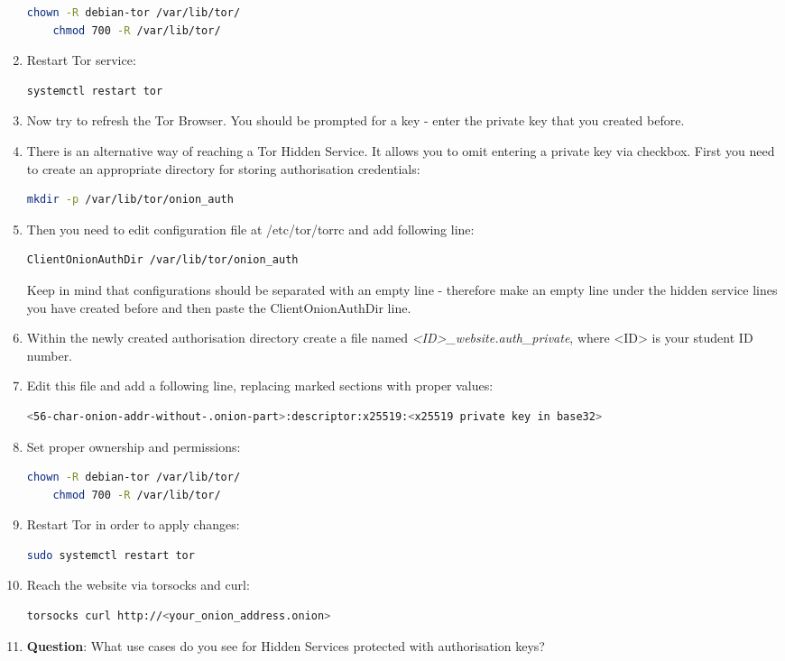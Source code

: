 \begin{enumerate}
\begin{lstlisting}[language=bash]
    chown -R debian-tor /var/lib/tor/
    chmod 700 -R /var/lib/tor/
    \end{lstlisting}
    \item Restart Tor service:
    \begin{lstlisting}[language=bash]
    systemctl restart tor
    \end{lstlisting}
    \item Now try to refresh the Tor Browser. You should be prompted for a key - enter the private key that you created before.
    \item There is an alternative way of reaching a Tor Hidden Service. It allows you to omit entering a private key via checkbox. First you need to create an appropriate directory for storing authorisation credentials:
    \begin{lstlisting}[language=bash]
    mkdir -p /var/lib/tor/onion_auth
    \end{lstlisting}
    \item Then you need to edit configuration file at /etc/tor/torrc and add following line:
    \begin{lstlisting}[language=bash]
    ClientOnionAuthDir /var/lib/tor/onion_auth
    \end{lstlisting}
    Keep in mind that configurations should be separated with an empty line - therefore make an empty line under the hidden service lines you have created before and then paste the ClientOnionAuthDir line.
    \item Within the newly created authorisation directory create a file named \textit{<ID>\_website.auth\_private}, where <ID> is your student ID number.
    \item Edit this file and add a following line, replacing marked sections with proper values:
    \begin{lstlisting}[language=bash, breaklines=true, breakatwhitespace=true]
    <56-char-onion-addr-without-.onion-part>:descriptor:x25519:<x25519 private key in base32>
    \end{lstlisting}
    \item Set proper ownership and permissions:
    \begin{lstlisting}[language=bash]
    chown -R debian-tor /var/lib/tor/
    chmod 700 -R /var/lib/tor/  
    \end{lstlisting}
    \item Restart Tor in order to apply changes:
    \begin{lstlisting}[language=bash]
    sudo systemctl restart tor 
    \end{lstlisting}
    \item Reach the website via torsocks and curl:
    \begin{lstlisting}[language=bash]
    torsocks curl http://<your_onion_address.onion>
    \end{lstlisting}
    \item \textbf{Question}: What use cases do you see for Hidden Services protected with authorisation keys?
\end{enumerate}

